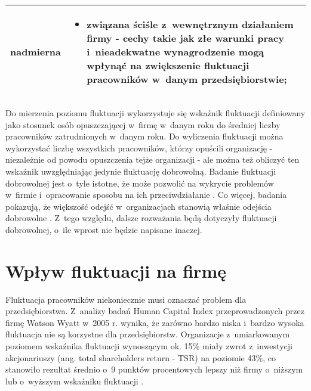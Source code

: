 \begin{minipage}{\textwidth}
\begin{table}[H]
\begin{center}
\begin{tabular}{|P{.15\textwidth}|P{.75\textwidth}|}
                         nadmierna &
                         \begin{itemize}
                             \item związana ściśle z~wewnętrznym działaniem firmy - cechy takie jak złe warunki pracy i~nieadekwatne wynagrodzenie mogą wpłynąć na zwiększenie fluktuacji pracowników w~danym przedsiębiorstwie;
                         \end{itemize} \\
                         \hline
                     \end{tabular}
                 \end{center}
                 \raggedright{}
                 \vspace{0.75cm}
             \end{table}
\end{minipage}

Do mierzenia poziomu fluktuacji wykorzystuje się wskaźnik fluktuacji definiowany jako stosunek osób opuszczającej w~firmę w~danym roku do średniej liczby pracowników zatrudnionych w~danym roku.
Do wyliczenia fluktuacji można wykorzystać liczbę wszystkich pracowników, którzy opuścili organizację - niezależnie od powodu opuszczenia tejże organizacji - ale można też obliczyć ten wskaźnik uwzględniając jedynie fluktuację dobrowolną.
Badanie fluktuacji dobrowolnej jest o~tyle istotne, że może pozwolić na wykrycie problemów w~firmie i~opracowanie sposobu na ich przeciwdziałanie \cite{spychala-2019}.
Co więcej, badania pokazują, że większość odejść w~organizacjach stanowią właśnie odejścia dobrowolne \cite{dalton-1982}.
Z~tego względu, dalsze rozważania będą dotyczyły fluktuacji dobrowolnej, o~ile wprost nie będzie napisane inaczej.


\section{Wpływ fluktuacji na firmę}\label{sec:wplyw-fluktuacji-na-firme}
Fluktuacja pracowników niekoniecznie musi oznaczać problem dla przedsiębiorstwa.
Z~analizy badań Human Capital Index przeprowadzonych przez firmę Watson Wyatt w~2005 r. wynika,
że zarówno bardzo niska i~bardzo wysoka fluktuacja nie są korzystne dla przedsiębiorstw.
Organizacje z~umiarkowanym poziomem wskaźnika fluktuacji wynoszącym ok. 15\%
miały zwrot z~inwestycji akcjonariuszy (ang. total shareholders return - TSR) na poziomie 43\%,
co stanowiło rezultat średnio o~9 punktów procentowych lepszy niż firmy o~niższym lub o~wyższym wskaźniku fluktuacji \cite{krol-ludwiczynski-2006}.

